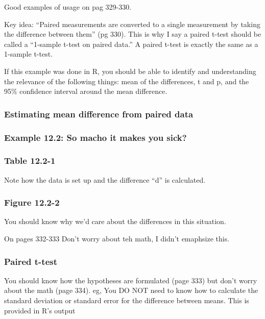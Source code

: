 \documentclass[]{book}
\theoremstyle{definition}
\theoremstyle{definition}
\theoremstyle{definition}
\theoremstyle{remark}
\begin{document}
Good examples of usage on pag 329-330.

Key idea: ``Paired measurements are converted to a single measurement by
taking the difference between them'' (pg 330). This is why I say a
paired t-test should be called a ``1-sample t-test on paired data.'' A
paired t-test is exactly the same as a 1-sample t-test.

If this example was done in R, you should be able to identify and
understanding the relevance of the following things: mean of the
differences, t and p, and the 95\% confidence interval around the mean
difference.

\subsubsection{Estimating mean difference from paired
data}\label{estimating-mean-difference-from-paired-data}

\subsubsection{Example 12.2: So macho it makes you
sick?}\label{example-12.2-so-macho-it-makes-you-sick}

\subsubsection{Table 12.2-1}\label{table-12.2-1}

Note how the data is set up and the difference ``d'' is calculated.

\subsubsection{Figure 12.2-2}\label{figure-12.2-2}

You should know why we'd care about the differences in this situation.

On pages 332-333 Don't worry about teh math, I didn't emaphsize this.

\subsubsection{Paired t-test}\label{paired-t-test}

You should know how the hypotheses are formulated (page 333) but don't
worry about the math (page 334). eg, You DO NOT need to know how to
calculate the standard deviation or standard error for the difference
between means. This is provided in R's output
\end{document}
